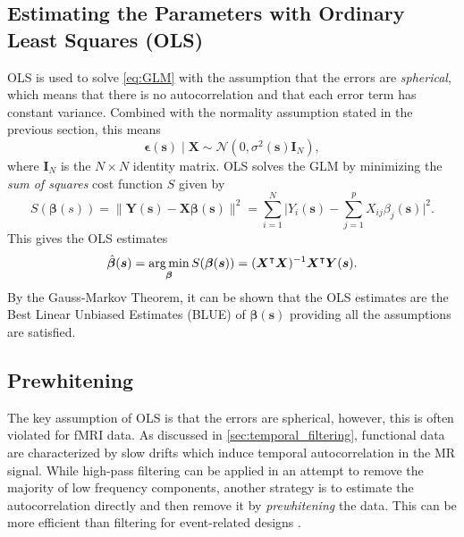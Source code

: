 \subsection{Estimating the Parameters with Ordinary Least Squares (OLS)} 
\label{sec:OLS}

OLS is used to solve \ref{eq:GLM} with the assumption that the errors are \textit{spherical}, which means that there is no autocorrelation and that each error term has constant variance. Combined with the normality assumption stated in the previous section, this means
\begin{equation}
\label{eq:OLS_errors}
\bm{\epsilon}(\bm{s}) \mid \bm{X} \sim  \mathcal{N}(0, \sigma^{2}(\bm{s})\bm{I}_{N}),
\end{equation}
where $\bm{I}_{N}$ is the $N \times N$ identity matrix. OLS solves the GLM by minimizing the \textit{sum of squares} cost function $S$ given by
\begin{equation}
\label{eq:OLS_cost}
S(\bm{\beta}(s))  = \lVert \bm{Y}(\bm{s}) - \bm{X}\bm{\beta}(\bm{s}) \rVert^{2} = \sum_{i = 1}^{N} \lvert Y_i(\bm{s}) - \sum_{j = 1}^{p} X_{ij} \beta_j (\bm{s}) \rvert ^{2}.
\end{equation}
This gives the OLS estimates
\begin{equation}
\label{eq:OLS_estimates}
\hat{\bm{\beta}}(\bm{s}) = \operatorname*{arg\,min}_{\bm{\beta}} S(\bm{\beta}(\bm{s})) = (\bm{X}^{\intercal}\bm{X})^{-1}\bm{X}^{\intercal}\bm{Y}(\bm{s}).
\end{equation}
By the Gauss-Markov Theorem, it can be shown that the OLS estimates are the Best Linear Unbiased Estimates (BLUE) of $\bm{\beta}(\bm{s})$ providing all the assumptions are satisfied. 

\subsection{Prewhitening}
\label{sec:prewhitening}

The key assumption of OLS is that the errors are spherical, however, this is often violated for fMRI data. As discussed in \ref{sec:temporal_filtering}, functional data are characterized by slow drifts which induce temporal autocorrelation in the MR signal. While high-pass filtering can be applied in an attempt to remove the majority of low frequency components, another strategy is to estimate the autocorrelation directly and then remove it by \textit{prewhitening} the data. This can be more efficient than filtering for event-related designs \citep{Woolrich2001-tk}.

